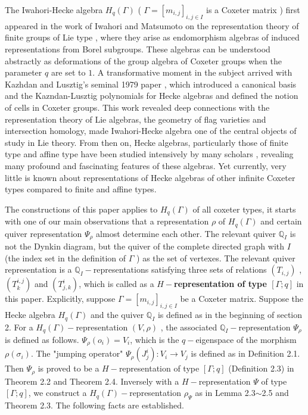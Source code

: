 \def\CTEXPreproc{Created by ctex v0.2.12, don't edit!}\documentclass[11pt]{article}
\begin{document}
The Iwahori-Hecke algebra $H_q (\Gamma)$ ( $\Gamma=[m_{i,j}]_{i,j\in I}$ is a Coxeter matrix  ) first appeared in the work of Iwahori and Matsumoto on the representation theory of finite groups of Lie type \cite{IM}, where they arise as endomorphism algebras of induced representations from Borel subgroups. These algebras can be understood abstractly as deformations of the group algebra of Coxeter groups when the parameter $q$ are set to $1$.  A transformative moment in the subject arrived with Kazhdan and Lusztig's seminal 1979 paper \cite{KL2}, which introduced a canonical basis and the Kazndan-Lusztig polynomials for Hecke algebras and defined the notion of cells in Coxeter groups. This work revealed deep connections with the representation theory of Lie algebras, the geometry of flag varieties and intersection homology, made Iwahori-Hecke algebra one of the central objects of study in Lie theory. From then on, Hecke algebras, particularly those of finite type and affine type have been studied intensively by many scholars \cite{Ar} \cite{Ch}\cite{EW}\cite{KL1}\cite{Lu1}\cite{Lu2}\cite{OS}\cite{Ra}\cite{So}\cite{Xi2}, revealing many profound and fascinating features of these algebras. Yet currently, very little is known about representations of Hecke algebras of other infinite Coxeter types compared to finite and affine types.

 The constructions of this paper applies to $H_q (\Gamma)$ of all coxeter types, it starts with one of our main observations that a representation $\rho $ of $H_q (\Gamma)$ and certain quiver representation $\Psi_{\rho}$ almost determine each other. The relevant quiver $\mathbb{Q}_I$ is not the Dynkin diagram, but the quiver of the complete directed graph with $I$ (the index set in the definition of $\Gamma$ ) as the set of vertexes. The relevant quiver representation is a $\mathbb{Q}_I -$representations satisfying three sets of relations $(T_{i,j})$ ,$(T^{i,j}_k )$ and $(T^i _{j,k})$, which is called as a \textbf{$H-$representation of type $[\Gamma;q]$} in this paper. Explicitly, suppose $\Gamma = [m_{i,j}]_{i,j\in I}$ be a Coxeter matrix. Suppose the Hecke algebra $H_q (\Gamma)$ and the quiver  $\mathbb{Q}_I$ is defined as in the beginning of section 2.  For a $H_q (\Gamma)-$representation $(V,\rho)$ , the associated $\mathbb{Q}_I -$representation
 $\Psi_{\rho}$ is defined as follows. $\Psi_{\rho}( o_i  )= V_i $, which is the $q-$eigenspace of the morphism $\rho(\sigma_i)$. The
 "jumping operator" $ \Psi_{\rho}( J^i _j) : V_i \rightarrow V_j $ is defined as in Definition 2.1. Then $\Psi_{\rho}$ is proved to be a $H-$representation of type $[\Gamma; q]$ (Definition 2.3) in Theorem 2.2 and Theorem 2.4. Inversely with a $H-$representation $\Psi$ of type $[\Gamma ;q]$, we construct a $H_{q}(\Gamma)-$representation $\rho_{\Psi}$ as in Lemma 2.3$\sim$2.5 and Theorem 2.3. The following facts are established.
\end{document}
